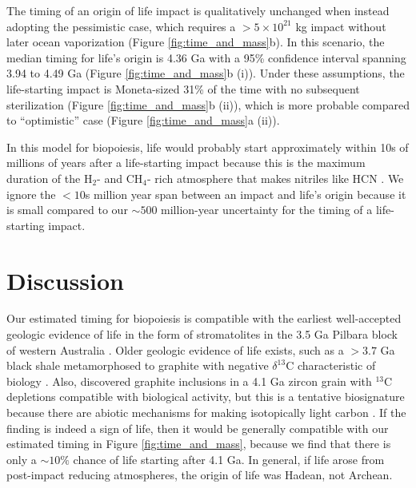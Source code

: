 \documentclass[manuscript]{aastex63}
\begin{document}
The timing of an origin of life impact is qualitatively unchanged when instead adopting the \citet{Wogan_2023} pessimistic case, which requires a $> 5 \times 10^{21}$ kg impact without later ocean vaporization (Figure \ref{fig:time_and_mass}b). In this scenario, the median timing for life's origin is 4.36 Ga with a 95\% confidence interval spanning 3.94 to 4.49 Ga (Figure \ref{fig:time_and_mass}b (i)). Under these assumptions, the life-starting impact is Moneta-sized 31\% of the time with no subsequent sterilization (Figure \ref{fig:time_and_mass}b (ii)), which is more probable compared to ``optimistic'' case (Figure \ref{fig:time_and_mass}a (ii)).

In this model for biopoiesis, life would probably start approximately within 10s of millions of years after a life-starting impact because this is the maximum duration of the H$_2$- and CH$_4$- rich atmosphere that makes nitriles like HCN \citep{Wogan_2023}. We ignore the $< 10$s million year span between an impact and life's origin because it is small compared to our $\sim 500$ million-year uncertainty for the timing of a life-starting impact.

\section{Discussion}

Our estimated timing for biopoiesis is compatible with the earliest well-accepted geologic evidence of life in the form of stromatolites in the 3.5 Ga Pilbara block of western Australia \citep{Walter_1980,Buick_1981,Van_2018}. Older geologic evidence of life exists, such as a $> 3.7$ Ga black shale metamorphosed to graphite with negative $\delta^{13}$C characteristic of biology \citep{Rosing_1999,Ohtomo_2014}. Also, \citet{Bell_2015} discovered graphite inclusions in a 4.1 Ga zircon grain with $^{13}$C depletions compatible with biological activity, but this is a tentative biosignature because there are abiotic mechanisms for making isotopically light carbon \citep{Javaux_2019}. If the \citet{Bell_2015} finding is indeed a sign of life, then it would be generally compatible with our estimated timing in Figure \ref{fig:time_and_mass}, because we find that there is only a $\sim 10\%$ chance of life starting after 4.1 Ga. In general, if life arose from post-impact reducing atmospheres, the origin of life was Hadean, not Archean.
\end{document}
